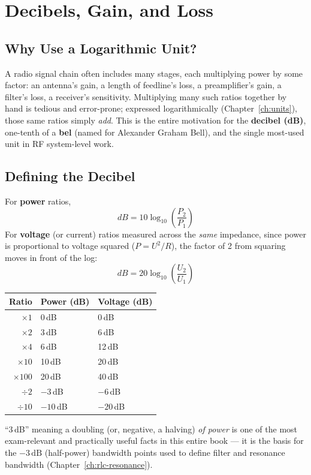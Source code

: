 \chapter{Decibels, Gain, and Loss}
\label{ch:decibels}

\section{Why Use a Logarithmic Unit?}

A radio signal chain often includes many stages, each multiplying power
by some factor: an antenna's gain, a length of feedline's loss, a
preamplifier's gain, a filter's loss, a receiver's sensitivity. Multiplying
many such ratios together by hand is tedious and error-prone; expressed
logarithmically (Chapter~\ref{ch:units}), those same ratios simply
\emph{add}. This is the entire motivation for the \textbf{decibel (dB)},
one-tenth of a \textbf{bel} (named for Alexander Graham Bell), and the
single most-used unit in RF system-level work.

\section{Defining the Decibel}

For \textbf{power} ratios,
\[
\boxed{dB = 10\log_{10}\!\left(\frac{P_2}{P_1}\right)}
\]
For \textbf{voltage} (or current) ratios measured across the \emph{same}
impedance, since power is proportional to voltage squared
($P = U^2/R$), the factor of 2 from squaring moves in front of the log:
\[
\boxed{dB = 20\log_{10}\!\left(\frac{U_2}{U_1}\right)}
\]

\begin{keyidea}
\begin{center}
\begin{tabular}{@{}rll@{}}
\toprule
Ratio & Power (dB) & Voltage (dB) \\
\midrule
$\times 1$ & 0\,dB & 0\,dB \\
$\times 2$ & 3\,dB & 6\,dB \\
$\times 4$ & 6\,dB & 12\,dB \\
$\times 10$ & 10\,dB & 20\,dB \\
$\times 100$ & 20\,dB & 40\,dB \\
$\div 2$ & $-3$\,dB & $-6$\,dB \\
$\div 10$ & $-10$\,dB & $-20$\,dB \\
\bottomrule
\end{tabular}
\end{center}
``3\,dB'' meaning a doubling (or, negative, a halving) \emph{of power}
is one of the most exam-relevant and practically useful facts in this
entire book --- it is the basis for the $-3\,\text{dB}$ (half-power)
bandwidth points used to define filter and resonance bandwidth
(Chapter~\ref{ch:rlc-resonance}).
\end{keyidea}

